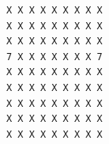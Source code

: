 \begin{Verbatim}[fontsize=\small, frame=single]
X X X X X X X X X
X X X X X X X X X
X X X X X X X X X
7 X X X X X X X 7
X X X X X X X X X
X X X X X X X X X
X X X X X X X X X
X X X X X X X X X
X X X X X X X X X
\end{Verbatim}
